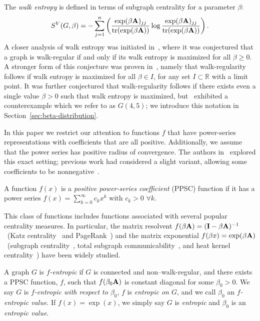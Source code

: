 The \emph{walk entropy} is defined in terms of subgraph centrality for a parameter $\beta$:
\begin{align}\label{eqn:walk-entropy}
  S^V(G, \beta) = -\sum_{j=1}^n \left( \frac{\exp(\beta\textbf{A})_{jj}}{\operatorname{tr} (\exp(\beta\textbf{A}))}  \log \frac{\exp(\beta\textbf{A})_{jj}}{\operatorname{tr} (\exp(\beta\textbf{A}))} \right).
\end{align}
A closer analysis of walk entropy was initiated in~\cite{estrada2014walk}, where it was conjectured that a graph is walk-regular if and only if its walk entropy is maximized for all $\beta \geq 0$.
A stronger form of this conjecture was proven in~\cite{benzi2014note}, namely that walk-regularity follows if walk entropy is maximized for all $\beta \in I$, for any set $I\subset \mathbb{R}$ with a limit point.
It was further conjectured that walk-regularity follows if there exists even a single value $\beta > 0$ such that walk entropy is maximized, but~\cite{Kloster2018115} exhibited a counterexample which we refer to as $G(4,5)$;
we introduce this notation in Section~\ref{sec:beta-distribution}.

In this paper we restrict our attention to functions $f$ that have power-series representations with coefficients that are all positive.
Additionally, we assume that the power series has positive radius of convergence.
The authors in~\cite{benzi2015limiting} explored this exact setting;
previous work had considered a slight variant, allowing some coefficients to be nonnegative~\cite{estrada2010network, rodriguez2007functional}.
\begin{definition}\label{def:positive-power}
  A function $f(x)$ is a \emph{positive power-series coefficient} (PPSC) function if it has a power series $f(x) = \sum_{k=0}^{\infty} c_k x^k$ with $c_k > 0$ $\forall k$.
\end{definition}
This class of functions includes functions associated with several popular centrality measures.
In particular, the matrix resolvent $f(\beta \textbf{A}) = (\textbf{I} - \beta\textbf{A})^{-1}$~(Katz centrality~\cite{katz1953new} and PageRank~\cite{gleich2015pagerank,page1999pagerank})
and the matrix exponential $f(\beta x) = \exp(\beta \textbf{A})$~(subgraph centrality~\cite{estrada2005subgraph}, total subgraph communicability~\cite{benzi2013total}, and heat kernel centrality~\cite{chung2007heat}) have been widely studied.

\begin{definition}\label{def:entropic}
  A graph $G$ is \emph{$f$-entropic} if $G$ is connected and non--walk-regular, and
  there exists a PPSC function, $f$, such that $f(\beta_0\textbf{A})$ is constant diagonal for some $\beta_0 > 0$.
  We say $G$ is \emph{$f$-entropic with respect to $\beta_0$}, $f$ is \emph{entropic on $G$}, and we call $\beta_0$ an \emph{$f$-entropic value}.
  If $f(x) = \exp(x)$, we simply say $G$ is \emph{entropic} and $\beta_0$ is an \emph{entropic value}.
\end{definition}

